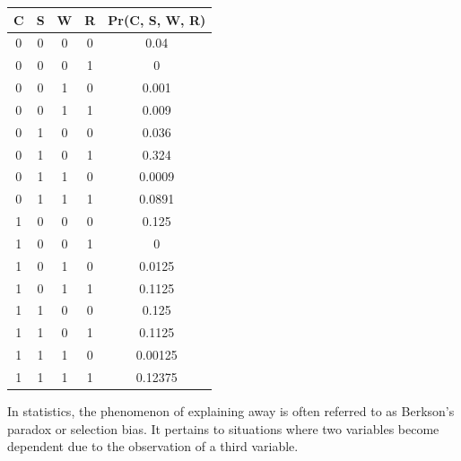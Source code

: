 \begin{example}
    \begin{table}[H]
        \centering
        \begin{tabular}{cccc|c}
        \hline
        \textbf{C} & \textbf{S} & \textbf{W} & \textbf{R} & \textbf{Pr(C, S, W, R)} \\ \hline
        0          & 0          & 0          & 0          & 0.04                \\
        0          & 0          & 0          & 1          & 0                   \\
        0          & 0          & 1          & 0          & 0.001               \\
        0          & 0          & 1          & 1          & 0.009               \\
        0          & 1          & 0          & 0          & 0.036               \\
        0          & 1          & 0          & 1          & 0.324               \\
        0          & 1          & 1          & 0          & 0.0009              \\
        0          & 1          & 1          & 1          & 0.0891              \\
        1          & 0          & 0          & 0          & 0.125               \\
        1          & 0          & 0          & 1          & 0                   \\
        1          & 0          & 1          & 0          & 0.0125              \\
        1          & 0          & 1          & 1          & 0.1125              \\
        1          & 1          & 0          & 0          & 0.125               \\
        1          & 1          & 0          & 1          & 0.1125              \\
        1          & 1          & 1          & 0          & 0.00125             \\
        1          & 1          & 1          & 1          & 0.12375             \\ \hline
        \end{tabular}
    \end{table}
\end{example}
In statistics, the phenomenon of explaining away is often referred to as Berkson's paradox or selection bias. It pertains to situations where two variables become dependent due to the observation of a third variable. 

